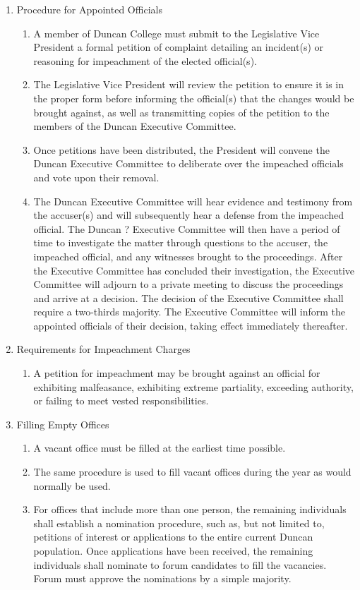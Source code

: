 \documentclass[11pt]{amsart}
\begin{document}
\begin{enumerate}
\begin{enumerate}
	\end{enumerate}
	\item Procedure for Appointed Officials
	\begin{enumerate}
		\item A member of Duncan College must submit to the Legislative Vice President a formal
petition of complaint detailing an incident(s) or reasoning for impeachment of the elected
official(s).
		\item The Legislative Vice President will review the petition to ensure it is in the proper form
before informing the official(s) that the changes would be brought against, as well as
transmitting copies of the petition to the members of the Duncan Executive Committee.
		\item Once petitions have been distributed, the President will convene the Duncan Executive
Committee to deliberate over the impeached officials and vote upon their removal.
		\item The Duncan Executive Committee will hear evidence and testimony from the accuser(s)
and will subsequently hear a defense from the impeached official. The Duncan
?
Executive Committee will then have a period of time to investigate the matter through questions to the accuser, the impeached official, and any witnesses brought to the proceedings. After the Executive Committee has concluded their investigation, the Executive Committee will adjourn to a private meeting to discuss the proceedings and arrive at a decision. The decision of the Executive Committee shall require a two-thirds majority. The Executive Committee will inform the appointed officials of their decision, taking effect immediately thereafter.
	\end{enumerate}
	\item Requirements for Impeachment Charges
	\begin{enumerate}
		\item A petition for impeachment may be brought against an official for exhibiting
malfeasance, exhibiting extreme partiality, exceeding authority, or failing to meet vested responsibilities.
	\end{enumerate} 
	\item Filling Empty Offices
	\begin{enumerate}
		\item A vacant office must be filled at the earliest time possible.
		\item The same procedure is used to fill vacant offices during the year as would normally be
used.
		\item For offices that include more than one person, the remaining individuals shall establish
a nomination procedure, such as, but not limited to, petitions of interest or applications to the entire current Duncan population. Once applications have been received, the remaining individuals shall nominate to forum candidates to fill the vacancies. Forum must approve the nominations by a simple majority.
	\end{enumerate}
\end{enumerate}
\end{document}
